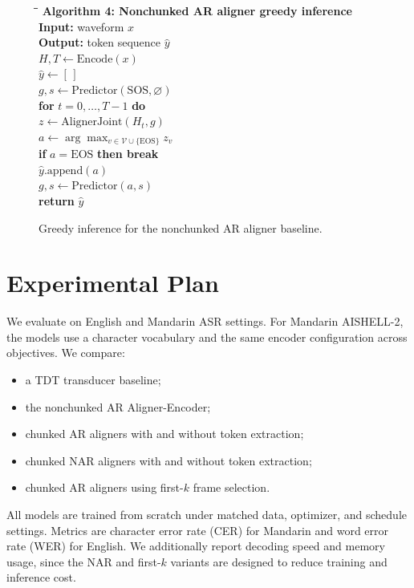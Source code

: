 \documentclass[conference]{IEEEtran}
\begin{document}
\begin{figure}[t]
\small
\begin{tabbing}
\hspace{0.03in}\=\hspace{0.20in}\=\hspace{0.20in}\=\kill
\textbf{Algorithm 4: Nonchunked AR aligner greedy inference}\\
\textbf{Input:} waveform $x$\\
\textbf{Output:} token sequence $\hat{y}$\\
$H,T \leftarrow \mathrm{Encode}(x)$\\
$\hat{y} \leftarrow [\,]$\\
$g,s \leftarrow \mathrm{Predictor}(\mathrm{SOS}, \varnothing)$\\
\textbf{for} $t=0,\ldots,T-1$ \textbf{do}\\
\> $z \leftarrow \mathrm{AlignerJoint}(H_t,g)$\\
\> $a \leftarrow \arg\max_{v \in \mathcal{V}\cup\{\mathrm{EOS}\}} z_v$\\
\> \textbf{if} $a=\mathrm{EOS}$ \textbf{then break}\\
\> $\hat{y}.\mathrm{append}(a)$\\
\> $g,s \leftarrow \mathrm{Predictor}(a,s)$\\
\textbf{return} $\hat{y}$
\end{tabbing}
\caption{Greedy inference for the nonchunked AR aligner baseline.}
\label{alg:aligner-ar}
\end{figure}

\section{Experimental Plan}

We evaluate on English and Mandarin ASR settings. For Mandarin AISHELL-2, the
models use a character vocabulary and the same encoder configuration across
objectives. We compare:
\begin{itemize}
  \item a TDT transducer baseline;
  \item the nonchunked AR Aligner-Encoder;
  \item chunked AR aligners with and without token extraction;
  \item chunked NAR aligners with and without token extraction;
  \item chunked AR aligners using first-$k$ frame selection.
\end{itemize}
All models are trained from scratch under matched data, optimizer, and schedule
settings. Metrics are character error rate (CER) for Mandarin and word error
rate (WER) for English. We additionally report decoding speed and memory usage,
since the NAR and first-$k$ variants are designed to reduce training and
inference cost.
\end{document}
